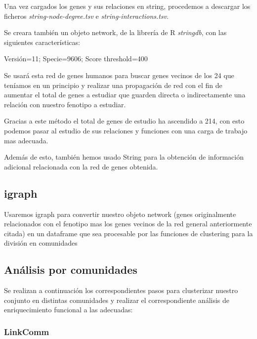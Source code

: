 Una vez cargados los genes y sus relaciones en string, procedemos a descargar los ficheros \textit{string-node-degree.tsv} e \textit{string-interactions.tsv}.

\hfill

Se creara también un objeto network, de la librería de R \textit{stringdb}, con las siguientes características:

\hfill

Versión=11; 
Specie=9606; 
Score threshold=400

\hfill

Se usará esta red de genes humanos para buscar genes vecinos de los 24 que teníamos en un principio y realizar una propagación de red con el fin de aumentar el total de genes a estudiar que guarden directa o indirectamente una relación con nuestro fenotipo a estudiar.

\hfill

Gracias a este método el total de genes de estudio ha ascendido a 214, con esto podemos pasar al estudio de sus relaciones y funciones con una carga de trabajo mas adecuada.

Además de esto, también hemos usado String para la obtención de información adicional relacionada con la red de genes obtenida.

\subsection{igraph}

Usaremos igraph para convertir nuestro objeto network (genes originalmente relacionados con el  fenotipo mas los genes vecinos de la red general anteriormente citada) en un dataframe que sea procesable por las funciones de clustering para la división en comunidades

\hfill

\subsection{Análisis por comunidades}

Se realizan a continuación los correspondientes pasos para clusterizar nuestro conjunto en distintas comunidades y realizar el correspondiente análisis de enriquecimiento funcional a las adecuadas:

\subsubsection{LinkComm}

